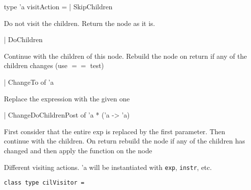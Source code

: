 \documentclass[11pt]{article}
\begin{document}
\label{type:Cil.visitAction}\begin{ocamldoccode}
type 'a visitAction =
  | SkipChildren
\end{ocamldoccode}
\begin{ocamldoccomment}
Do not visit the children. Return 
                                            the node as it is.
\end{ocamldoccomment}
\begin{ocamldoccode}
  | DoChildren
\end{ocamldoccode}
\begin{ocamldoccomment}
Continue with the children of this 
                                            node. Rebuild the node on return 
                                            if any of the children changes 
                                            (use $=$$=$ test)
\end{ocamldoccomment}
\begin{ocamldoccode}
  | ChangeTo of 'a
\end{ocamldoccode}
\begin{ocamldoccomment}
Replace the expression with the 
                                            given one
\end{ocamldoccomment}
\begin{ocamldoccode}
  | ChangeDoChildrenPost of 'a * ('a -> 'a)
\end{ocamldoccode}
\begin{ocamldoccomment}
First consider that the entire 
                                           exp is replaced by the first 
                                           parameter. Then continue with 
                                           the children. On return rebuild 
                                           the node if any of the children 
                                           has changed and then apply the 
                                           function on the node
\end{ocamldoccomment}
\begin{ocamldocdescription}
Different visiting actions. 'a will be instantiated with {\tt{exp}}, {\tt{instr}},
    etc.


\end{ocamldocdescription}




\begin{ocamldoccode}
{\tt{class type cilVisitor = }}\end{ocamldoccode}
\label{classtype:Cil.cilVisitor}
\end{document}
